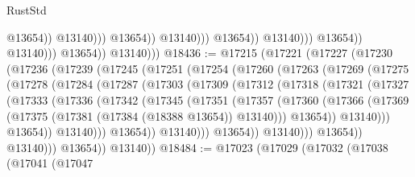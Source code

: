 \begin{lexlean}{RustStd}
\begin{coremodule}
                                                      @13654))
                                                  @13140)))
                                            @13654))
                                        @13140)))
                                  @13654))
                              @13140)))
                        @13654))
                    @13140)))
              @13654))
          @13140)))
@18436 := @17215
    (@17221
      (@17227
        (@17230
          (@17236
            (@17239
              (@17245
                (@17251
                  (@17254
                    (@17260
                      (@17263
                        (@17269
                          (@17275
                            (@17278
                              (@17284
                                (@17287
                                  (@17303
                                    (@17309
                                      (@17312
                                        (@17318
                                          (@17321
                                            (@17327
                                              (@17333
                                                (@17336
                                                  (@17342
                                                    (@17345
                                                      (@17351
                                                        (@17357
                                                          (@17360
                                                            (@17366
                                                              (@17369
                                                                (@17375
                                                                  (@17381
                                                                    (@17384 (@18388 @13654))
                                                                    @13140)))
                                                              @13654))
                                                          @13140)))
                                                    @13654))
                                                @13140)))
                                          @13654))
                                      @13140)))
                                @13654))
                            @13140)))
                      @13654))
                  @13140)))
            @13654))
        @13140))
@18484 := @17023
    (@17029
      (@17032
        (@17038
          (@17041
            (@17047

\end{coremodule}
\end{lexlean}
